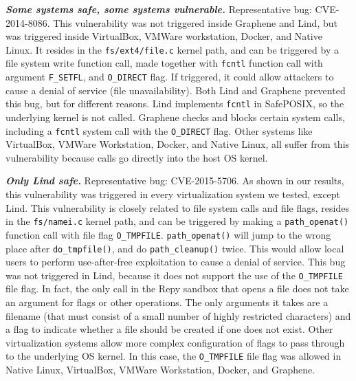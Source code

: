{{{\emph{\textbf{Some systems safe, some systems vulnerable.}}  Representative bug: CVE-2014-8086.
This vulnerability was not triggered inside Graphene and Lind, but was triggered inside
VirtualBox, VMWare workstation, Docker, and Native Linux. It resides in
the \texttt{fs/ext4/file.c} kernel path, and can be triggered by a file system write
function call, made together with \texttt{fcntl} function call
with argument \texttt{F\_SETFL}, and \texttt{O\_DIRECT} flag. If triggered, it could
allow attackers to cause a denial of service (file unavailability). Both Lind and
Graphene prevented this bug, but for different reasons. Lind
implements \texttt{fcntl} in SafePOSIX, so the underlying kernel is not called.
Graphene checks and blocks certain system calls, including
a \texttt{fcntl} system call with the \texttt{O\_DIRECT} flag.
Other systems like VirtualBox, VMWare Workstation, Docker, and Native Linux,
all suffer from this vulnerability because calls go directly into the host OS
kernel.

\emph{\textbf{Only Lind safe.}}  Representative bug: CVE-2015-5706. As
shown in our results, this vulnerability was triggered in every
virtualization system we tested, except Lind. This vulnerability
is closely related to file system calls and file flags, resides in the \texttt{fs/namei.c}
kernel path, and can be triggered by making a \texttt{path\_openat()} function
call with file flag \texttt{O\_TMPFILE}. \texttt{path\_openat()} will jump to the wrong
place after \texttt{do\_tmpfile()}, and do \texttt{path\_cleanup()} twice. This would
allow local users to perform use-after-free exploitation to cause a denial of service.
This bug was not triggered in Lind, because it does not support the use of the
\texttt{O\_TMPFILE} file flag. In fact, the only call in the Repy sandbox that
opens a file does not take an argument for flags or other operations.  The
only arguments it takes are a filename (that must consist of a small number
of highly restricted characters) and a flag to indicate whether a file should
be created if one does not exist.
Other virtualization systems allow more complex configuration of flags to
pass through to the underlying OS kernel.
In this case, the \texttt{O\_TMPFILE} file flag was
allowed in Native Linux, VirtualBox, VMWare Workstation, Docker, and Graphene.


}}}
